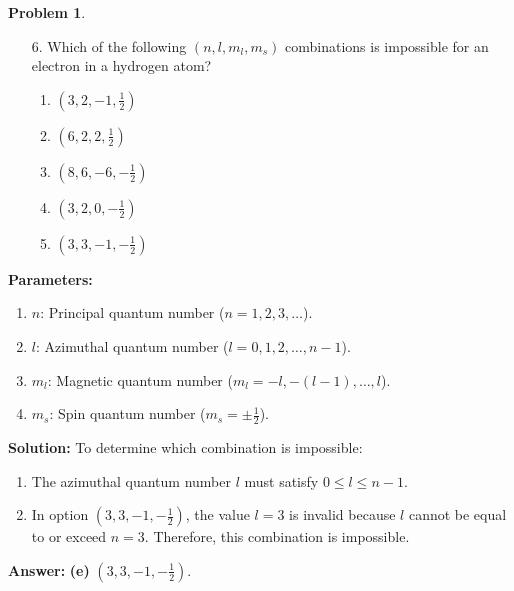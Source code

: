 \documentclass[12pt]{article}
\theoremstyle{definition} %
\newtheorem{problem}{Problem}
\theoremstyle{plain} %
\begin{document}
\begin{problem}
\begin{enumerate}
    \item[6.] Which of the following \((n, l, m_l, m_s)\) combinations is impossible for an electron in a hydrogen atom?
    \begin{enumerate}
        \item \((3, 2, -1, \frac{1}{2})\)
        \item \((6, 2, 2, \frac{1}{2})\)
        \item \((8, 6, -6, -\frac{1}{2})\)
        \item \((3, 2, 0, -\frac{1}{2})\)
        \item \((3, 3, -1, -\frac{1}{2})\)
    \end{enumerate}
\end{enumerate}
\textbf{Parameters:}
\begin{enumerate}
    \item \(n\): Principal quantum number (\(n = 1, 2, 3, \dots\)).
    \item \(l\): Azimuthal quantum number (\(l = 0, 1, 2, \dots, n-1\)).
    \item \(m_l\): Magnetic quantum number (\(m_l = -l, -(l-1), \dots, l\)).
    \item \(m_s\): Spin quantum number (\(m_s = \pm \frac{1}{2}\)).
\end{enumerate}
\textbf{Solution:}
To determine which combination is impossible:
\begin{enumerate}
    \item The azimuthal quantum number \(l\) must satisfy \(0 \leq l \leq n-1\).
    \item In option \((3, 3, -1, -\frac{1}{2})\), the value \(l = 3\) is invalid because \(l\) cannot be equal to or exceed \(n = 3\). Therefore, this combination is impossible.
\end{enumerate}

\textbf{Answer:} \textbf{(e)} \((3, 3, -1, -\frac{1}{2})\).

\end{problem}
\end{document}
